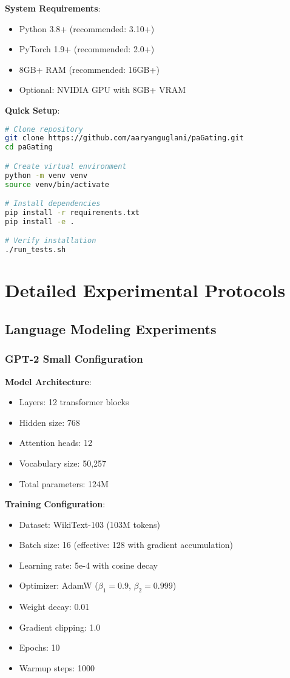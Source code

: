 \documentclass[journal]{IEEEtran}
\begin{document}
\textbf{System Requirements}:
\begin{itemize}
    \item Python 3.8+ (recommended: 3.10+)
    \item PyTorch 1.9+ (recommended: 2.0+)
    \item 8GB+ RAM (recommended: 16GB+)
    \item Optional: NVIDIA GPU with 8GB+ VRAM
\end{itemize}

\textbf{Quick Setup}:
\begin{lstlisting}[language=bash]
# Clone repository
git clone https://github.com/aaryanguglani/paGating.git
cd paGating

# Create virtual environment
python -m venv venv
source venv/bin/activate

# Install dependencies
pip install -r requirements.txt
pip install -e .

# Verify installation
./run_tests.sh
\end{lstlisting}

\section{Detailed Experimental Protocols}

\subsection{Language Modeling Experiments}

\subsubsection{GPT-2 Small Configuration}
\textbf{Model Architecture}:
\begin{itemize}
    \item Layers: 12 transformer blocks
    \item Hidden size: 768
    \item Attention heads: 12
    \item Vocabulary size: 50,257
    \item Total parameters: 124M
\end{itemize}

\textbf{Training Configuration}:
\begin{itemize}
    \item Dataset: WikiText-103 (103M tokens)
    \item Batch size: 16 (effective: 128 with gradient accumulation)
    \item Learning rate: 5e-4 with cosine decay
    \item Optimizer: AdamW ($\beta_1=0.9$, $\beta_2=0.999$)
    \item Weight decay: 0.01
    \item Gradient clipping: 1.0
    \item Epochs: 10
    \item Warmup steps: 1000
\end{itemize}
\end{document}

